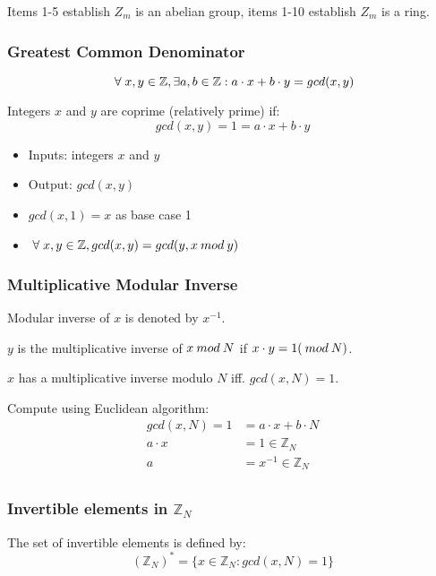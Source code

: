 \documentclass[a4paper]{article}
\begin{document}
Items 1-5 establish $Z_{m}$ is an abelian group, items 1-10 establish $Z_{m}$ is
a ring.

\subsubsection{Greatest Common Denominator}

\[\;\forall\; x, y \in \mathbb{Z}, \exists a, b \in \mathbb{Z} :
a \cdot x + b \cdot y = gcd(x, y)\]

Integers $x$ and $y$ are coprime (relatively prime) if:
\[gcd(x, y) = 1 = a \cdot x + b \cdot y\]


\begin{itemize}
  \item Inputs: integers $x$ and $y$
  \item Output: $gcd(x, y)$
  \item $gcd(x, 1) = x$ as base case 1
  \item $\;\forall\; x, y \in \mathbb{Z}, gcd(x, y) = gcd(y, x \: mod \: y)$
\end{itemize}

\subsubsection{Multiplicative Modular Inverse}

Modular inverse of $x$ is denoted by $x^{-1}$.

$y$ is the multiplicative inverse of $x \: mod \: N$ if $x \cdot y = 1 (\: mod \: N)$.

$x$ has a multiplicative inverse modulo $N$ iff. $gcd(x, N) = 1$.

Compute using Euclidean algorithm:
\begin{align*}
  gcd(x, N) = 1 &= a \cdot x + b \cdot N \\
  a \cdot x &= 1 \in \mathbb{Z}_{N} \\
  a &= x^{-1} \in \mathbb{Z}_{N} \\
\end{align*}

\subsubsection{Invertible elements in $\mathbb{Z}_{N}$}

The set of invertible elements is defined by:
\[
  (\mathbb{Z}_{N})^{*} = \{x \in \mathbb{Z}_{N} : gcd(x, N) = 1\}
\]
\end{document}
